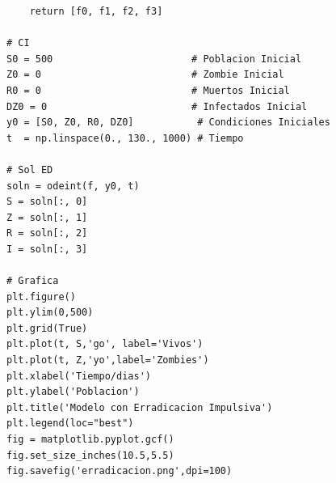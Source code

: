 \documentclass[a4paper]{article}
\begin{document}
\begin{verbatim}
    return [f0, f1, f2, f3]

# CI
S0 = 500                        # Poblacion Inicial
Z0 = 0                          # Zombie Inicial
R0 = 0                          # Muertos Inicial
DZ0 = 0                         # Infectados Inicial
y0 = [S0, Z0, R0, DZ0]           # Condiciones Iniciales
t  = np.linspace(0., 130., 1000) # Tiempo

# Sol ED
soln = odeint(f, y0, t)
S = soln[:, 0]
Z = soln[:, 1]
R = soln[:, 2]
I = soln[:, 3]

# Grafica
plt.figure()
plt.ylim(0,500)
plt.grid(True)
plt.plot(t, S,'go', label='Vivos')
plt.plot(t, Z,'yo',label='Zombies')
plt.xlabel('Tiempo/dias')
plt.ylabel('Poblacion')
plt.title('Modelo con Erradicacion Impulsiva')
plt.legend(loc="best")
fig = matplotlib.pyplot.gcf()
fig.set_size_inches(10.5,5.5)
fig.savefig('erradicacion.png',dpi=100)
\end{verbatim}
\end{document}
